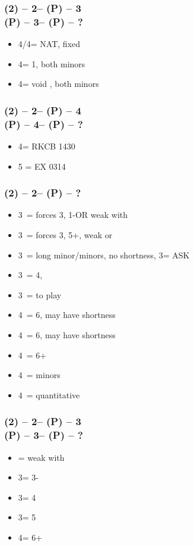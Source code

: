 \documentclass[12pt, a4paper]{article}
\begin{document}
\subsubsection*{(2\hearts) -- 2\nt -- (P) -- 3\spades \\
                (P) -- 3\nt -- (P) -- ?}
\begin{itemize}
    \item 4\clubs/4\diams = NAT, fixed
    \item 4\hearts = 1\spades, both minors
    \item 4\spades = void \spades, both minors
\end{itemize}

\subsubsection*{(2\hearts) -- 2\nt -- (P) -- 4\hearts \\
                (P) -- 4\spades -- (P) -- ?}
\begin{itemize}
    \item 4\nt = RKCB 1430
    \item 5 = EX 0314
\end{itemize}

\subsubsection*{(2\spades) -- 2\nt -- (P) -- ?}
\begin{itemize}
    \item 3\clubs\ = forces 3\diams, 1-\spades \gf OR weak with \diams
    \item 3\diams\ = forces 3\hearts, 5+\hearts, weak or \gf
    \item 3\hearts\ = long minor/minors, no \spades shortness, 3\spades = ASK
    \item 3\spades\ = 4\hearts, \gf
    \item 3\nt\ = to play
    \item 4\clubs\ = 6\hearts, may have shortness
    \item 4\diams\ = 6\hearts, may have shortness
    \item 4\hearts\ = 6+\hearts
    \item 4\spades\ = minors
    \item 4\nt\ = quantitative
\end{itemize}

\subsubsection*{(2\spades) -- 2\nt -- (P) -- 3\clubs \\
                (P) -- 3\diams -- (P) -- ?}
\begin{itemize}
    \item \pass = weak with \diams
    \item 3\hearts = 3-\hearts
    \item 3\spades = 4\hearts
    \item 3\nt = 5\hearts
    \item 4\clubs = 6+\hearts
\end{itemize}
\end{document}
